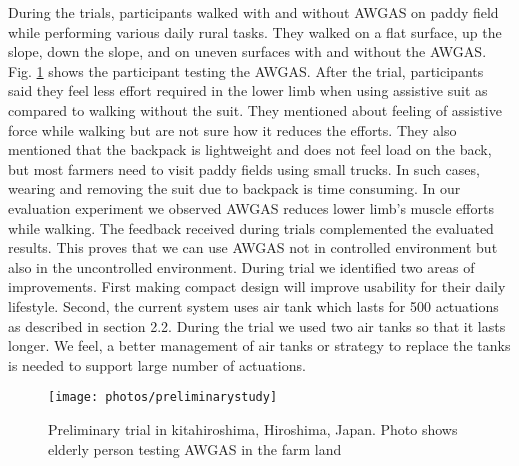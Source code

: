 \documentclass[paper,JRM,paper]{jaciiiarticle}
\begin{document}
During the trials, participants walked with and without AWGAS on paddy field while performing various daily rural tasks. They walked on a flat surface, up the slope, down the slope, and on uneven surfaces with and without the AWGAS. Fig. \ref{fig:preliminarystudy} shows the participant testing the AWGAS. After the trial, participants said they feel less effort required in the lower limb when using assistive suit as compared to walking without the suit. They mentioned about feeling of assistive force while walking but are not sure how it reduces the efforts. They also mentioned that the backpack is lightweight and does not feel load on the back, but most farmers need to visit paddy fields using small trucks. In such cases, wearing and removing the suit due to backpack is time consuming. In our evaluation experiment we observed AWGAS reduces lower limb’s muscle efforts while walking. The feedback received during trials complemented the evaluated results. This proves that we can use AWGAS not in controlled environment but also in the uncontrolled environment. During trial we identified two areas of improvements. First making compact design will improve usability for their daily lifestyle. Second, the current system uses air tank which lasts for 500 actuations as described in section 2.2. During the trial we used two air tanks so that it lasts longer. We feel, a better management of air tanks or strategy to replace the tanks is needed to support large number of actuations. 


\begin{figure}[h]
	\centering
	\texttt{[image: photos/preliminarystudy]}
	\caption{Preliminary trial in kitahiroshima, Hiroshima, Japan. Photo shows elderly person testing AWGAS in the farm land}
	\label{fig:preliminarystudy}
\end{figure}
\end{document}
